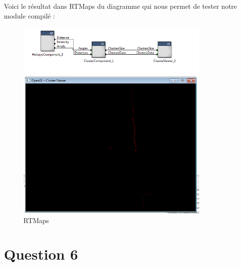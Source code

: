 Voici le résultat dans RTMaps du diagramme qui nous permet de tester notre module compilé :

\begin{figure}[!h]
   \centering\includegraphics[width=0.85\textwidth]{question5.png}
   \caption{RTMaps}
\end{figure}

\newpage
\section{Question 6}
